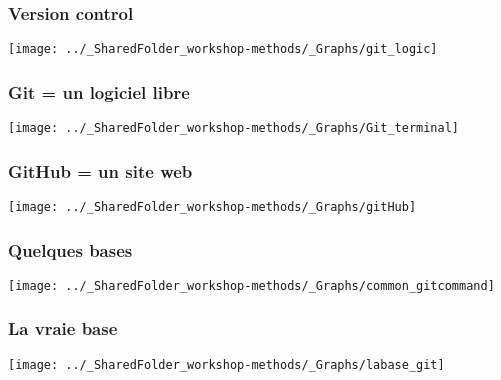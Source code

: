 \documentclass{beamer}
\begin{document}
	  \begin{frame}
	  
	        \frametitle{Version control} \vspace{1cm}   
	        \begin{center}
	           \texttt{[image: ../\_SharedFolder\_workshop-methods/\_Graphs/git\_logic]}
	        \end{center}  
	    \end{frame}
	    

	          \begin{frame}
	        \frametitle{Git = un logiciel libre} \vspace{1cm}   
	        \begin{center}
	           \texttt{[image: ../\_SharedFolder\_workshop-methods/\_Graphs/Git\_terminal]}
	        \end{center}  
	    \end{frame}
	    

	      \begin{frame}
	        \frametitle{GitHub = un site web} \vspace{1cm}   
	        \begin{center}
	           \texttt{[image: ../\_SharedFolder\_workshop-methods/\_Graphs/gitHub]}
	        \end{center}  
	    \end{frame}
	    

	      \begin{frame}
	        \frametitle{Quelques bases} \vspace{1cm}   
	        \begin{center}
	           \texttt{[image: ../\_SharedFolder\_workshop-methods/\_Graphs/common\_gitcommand]}
	        \end{center}  
	    \end{frame}
	    

	          \begin{frame}
	        \frametitle{La vraie base} \vspace{1cm}   
	        \begin{center}
	           \texttt{[image: ../\_SharedFolder\_workshop-methods/\_Graphs/labase\_git]}
	        \end{center}  
	    \end{frame}
	    
\end{document}
